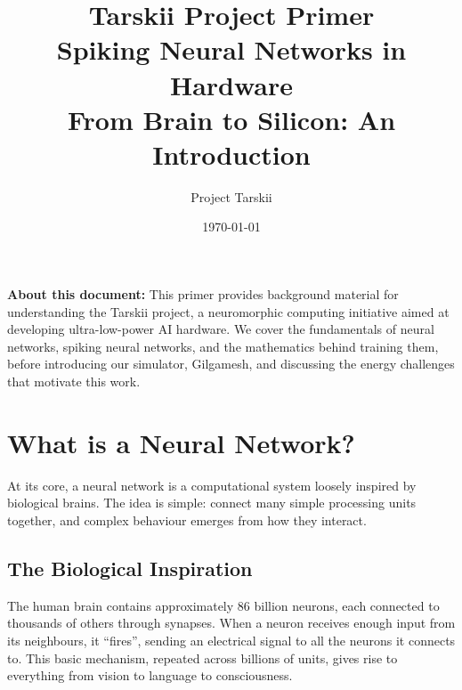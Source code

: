 \documentclass[11pt,a4paper]{article}
\title{
    \vspace{-1cm}
    {\Huge\bfseries\color{darkblue} Tarskii Project Primer}\\[0.5cm]
    {\Large\color{darkblue!70} Spiking Neural Networks in Hardware}\\[0.3cm]
    {\large\color{gray} From Brain to Silicon: An Introduction}
}
\author{Project Tarskii}
\date{\today}
\begin{document}
\maketitle
\thispagestyle{empty}

\vspace{1cm}

\begin{tcolorbox}[infobox]
\textbf{About this document:} This primer provides background material for understanding the Tarskii project, a neuromorphic computing initiative aimed at developing ultra-low-power AI hardware. We cover the fundamentals of neural networks, spiking neural networks, and the mathematics behind training them, before introducing our simulator, Gilgamesh, and discussing the energy challenges that motivate this work.
\end{tcolorbox}

\tableofcontents
\newpage

\section{What is a Neural Network?}

At its core, a neural network is a computational system loosely inspired by biological brains. The idea is simple: connect many simple processing units together, and complex behaviour emerges from how they interact.

\subsection{The Biological Inspiration}

The human brain contains approximately 86 billion neurons, each connected to thousands of others through synapses. When a neuron receives enough input from its neighbours, it ``fires'', sending an electrical signal to all the neurons it connects to. This basic mechanism, repeated across billions of units, gives rise to everything from vision to language to consciousness.
\end{document}
